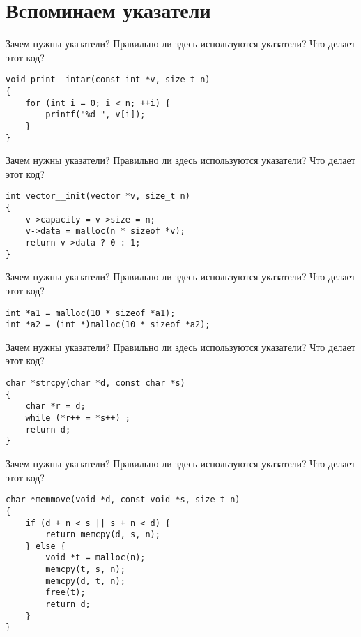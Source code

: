 \documentclass[hyperref={unicode=true}]{beamer}
\begin{document}
    \section{Вспоминаем указатели}

    \begin{frame}[fragile]{Зачем нужны указатели?}
    Правильно ли здесь используются указатели?
    Что делает этот код?
    \begin{lstlisting}
void print__intar(const int *v, size_t n)
{
    for (int i = 0; i < n; ++i) {
        printf("%d ", v[i]);
    }
}
    \end{lstlisting}
    \end{frame}

    \begin{frame}[fragile]{Зачем нужны указатели?}
    Правильно ли здесь используются указатели?
    Что делает этот код?
    \begin{lstlisting}
int vector__init(vector *v, size_t n)
{
    v->capacity = v->size = n;
    v->data = malloc(n * sizeof *v);
    return v->data ? 0 : 1;
}
    \end{lstlisting}
    \end{frame}

    \begin{frame}[fragile]{Зачем нужны указатели?}
    Правильно ли здесь используются указатели?
    Что делает этот код?
    \begin{lstlisting}
int *a1 = malloc(10 * sizeof *a1);
int *a2 = (int *)malloc(10 * sizeof *a2);
    \end{lstlisting}
    \end{frame}

    \begin{frame}[fragile]{Зачем нужны указатели?}
    Правильно ли здесь используются указатели?
    Что делает этот код?
    \begin{lstlisting}
char *strcpy(char *d, const char *s)
{
    char *r = d;
    while (*r++ = *s++) ;
    return d;
}
    \end{lstlisting}
    \end{frame}

    \begin{frame}[fragile]{Зачем нужны указатели?}
    Правильно ли здесь используются указатели?
    Что делает этот код?
    \begin{lstlisting}
char *memmove(void *d, const void *s, size_t n)
{
    if (d + n < s || s + n < d) {
        return memcpy(d, s, n);
    } else {
        void *t = malloc(n);
        memcpy(t, s, n);
        memcpy(d, t, n);
        free(t);
        return d;
    }
}
    \end{lstlisting}
    \end{frame}
\end{document}
